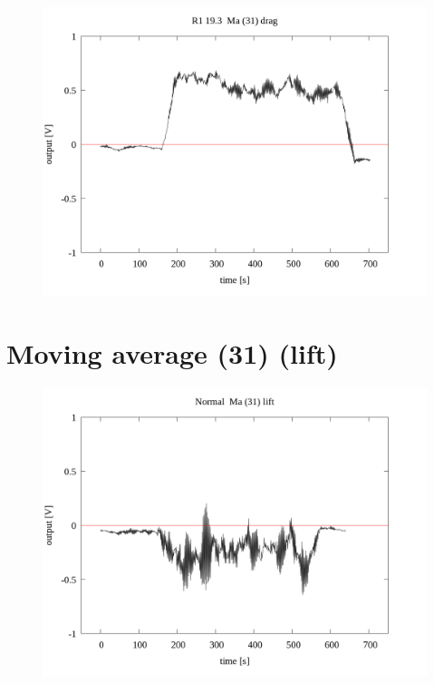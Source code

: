 \documentclass[a4paper]{jsarticle}
\begin{document}
\begin{figure}[htbp]
    \footnotesize
    \begin{center}
        \includegraphics[width=140mm]{../../../33_result/210806/moving_average/31/drag/R1_19.3_ma(31)_drag.png}
    \end{center}
\end{figure}

\section{Moving average (31) (lift)}

\begin{figure}[htbp]
    \footnotesize
    \begin{center}
        \includegraphics[width=140mm]{../../../33_result/210806/moving_average/31/lift/Normal_ma(31)_lift.png}
    \end{center}
\end{figure}
\end{document}
